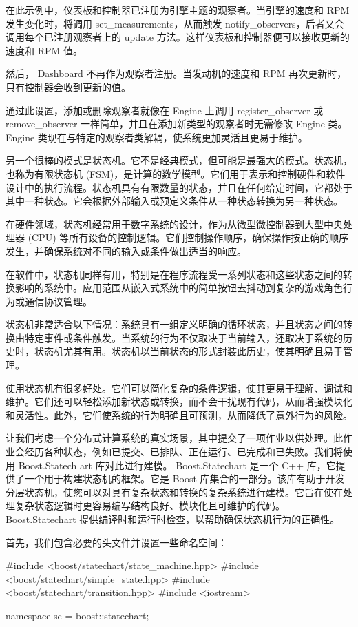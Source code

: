 在此示例中，仪表板和控制器已注册为引擎主题的观察者。当引擎的速度和 RPM 发生变化时，将调用 set\_measurements，从而触发 notify\_observers，后者又会调用每个已注册观察者上的 update 方法。这样仪表板和控制器便可以接收更新的速度和 RPM 值。

然后， Dashboard 不再作为观察者注册。当发动机的速度和 RPM 再次更新时，只有控制器会收到更新的值。

通过此设置，添加或删除观察者就像在 Engine 上调用 register\_observer 或 remove\_observer 一样简单，并且在添加新类型的观察者时无需修改 Engine 类。Engine 类现在与特定的观察者类解耦，使系统更加灵活且更易于维护。

另一个很棒的模式是状态机。它不是经典模式，但可能是最强大的模式。状态机，也称为有限状态机 (FSM)，是计算的数学模型。它们用于表示和控制硬件和软件设计中的执行流程。状态机具有有限数量的状态，并且在任何给定时间，它都处于其中一种状态。它会根据外部输入或预定义条件从一种状态转换为另一种状态。

在硬件领域，状态机经常用于数字系统的设计，作为从微型微控制器到大型中央处理器 (CPU) 等所有设备的控制逻辑。它们控制操作顺序，确保操作按正确的顺序发生，并确保系统对不同的输入或条件做出适当的响应。

在软件中，状态机同样有用，特别是在程序流程受一系列状态和这些状态之间的转换影响的系统中。应用范围从嵌入式系统中的简单按钮去抖动到复杂的游戏角色行为或通信协议管理。

状态机非常适合以下情况：系统具有一组定义明确的循环状态，并且状态之间的转换由特定事件或条件触发。当系统的行为不仅取决于当前输入，还取决于系统的历史时，状态机尤其有用。状态机以当前状态的形式封装此历史，使其明确且易于管理。

使用状态机有很多好处。它们可以简化复杂的条件逻辑，使其更易于理解、调试和维护。它们还可以轻松添加新状态或转换，而不会干扰现有代码，从而增强模块化和灵活性。此外，它们使系统的行为明确且可预测，从而降低了意外行为的风险。

让我们考虑一个分布式计算系统的真实场景，其中提交了一项作业以供处理。此作业会经历各种状态，例如已提交、已排队、正在运行、已完成和已失败。我们将使用 Boost.Statech art 库对此进行建模。 Boost.Statechart 是一个 C++ 库，它提供了一个用于构建状态机的框架。它是 Boost 库集合的一部分。该库有助于开发分层状态机，使您可以对具有复杂状态和转换的复杂系统进行建模。它旨在使在处理复杂状态逻辑时更容易编写结构良好、模块化且可维护的代码。 Boost.Statechart 提供编译时和运行时检查，以帮助确保状态机行为的正确性。

首先，我们包含必要的头文件并设置一些命名空间：

\begin{cpp}
#include <boost/statechart/state_machine.hpp>
#include <boost/statechart/simple_state.hpp>
#include <boost/statechart/transition.hpp>
#include <iostream>

namespace sc = boost::statechart;
\end{cpp}

